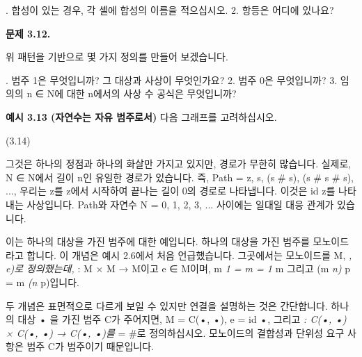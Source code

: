 \documentclass[11pt, a4paper, twoside, openany]{book}
\begin{document}
{\par{}. 합성이 있는 경우, 각 셀에 합성의 이름을 적으십시오.
2. 항등은 어디에 있나요?

\par\medskip
\textbf{문제 3.12.}

\par\medskip
위 패턴을 기반으로 몇 가지 정의를 만들어 보겠습니다.

\par{}. 범주 1\hspace{0pt}은 무엇입니까? 그 대상과 사상이 무엇인가요?
2. 범주 0\hspace{0pt}은 무엇입니까?
3. 임의의 n ∈ N\hspace{0pt}에 대한 n\hspace{0pt}에서의 사상 수 공식은 무엇입니까?

\par\medskip
\textbf{예시 3.13 (자연수는 자유 범주로서)} 다음 그래프를 고려하십시오.

\par\medskip
(3.14)

\par\medskip
그것은 하나의 정점과 하나의 화살만 가지고 있지만, 경로가 무한히 많습니다. 실제로, N ∈ N\hspace{0pt}에서 길이 n\hspace{0pt}인 유일한 경로가 있습니다. 즉, Path = {z, s, (s \# s), (s \# s \# s), ...}, 우리는 z\hspace{0pt}를 z\hspace{0pt}에서 시작하여 끝나는 길이 0\hspace{0pt}의 경로로 나타냅니다. 이것은 id z\hspace{0pt}를 나타내는 사상입니다. Path\hspace{0pt}와 자연수 N = {0, 1, 2, 3, ...} 사이에는 일대일 대응 관계가 있습니다.

\par\medskip
이는 하나의 대상을 가진 범주에 대한 예입니다. 하나의 대상을 가진 범주를 모노이드라고 합니다. 이 개념은 예시 2.6\hspace{0pt}에서 처음 언급했습니다. 그곳에서는 모노이드를 M, \textit{, e)로 정의했는데, } : M × M → M\hspace{0pt}이고 e ∈ M\hspace{0pt}이며, m \textit{ 1 = m = 1 } m 그리고 (m \textit{ n) } p = m \textit{ (n } p)입니다.

\par\medskip
두 개념은 표면적으로 다르게 보일 수 있지만 연결을 설명하는 것은 간단합니다. 하나의 대상 • 을 가진 범주 C\hspace{0pt}가 주어지면, M = C(•, •), e = id •, 그리고 \textit{ : C(•, •) × C(•, •) → C(•, •)를 } = \#로 정의하십시오. 모노이드의 결합성과 단위성 요구 사항은 범주 C\hspace{0pt}가 범주이기 때문입니다.

}
\end{document}
